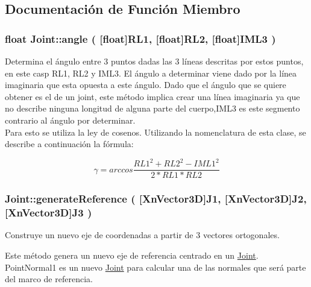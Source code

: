 \subsection{\-Documentación de \-Función \-Miembro}
\hypertarget{class_joint_ab4a853045a69e77e8b67d195be145eed}{
\subsubsection[{angle}]{\setlength{\rightskip}{0pt plus 5cm}float {\bf \-Joint\-::angle} (
[{float}]{\-R\-L1, }
[{float}]{\-R\-L2, }
[{float}]{\-I\-M\-L3}
)}}\label{class_joint_ab4a853045a69e77e8b67d195be145eed}
\-Determina el ángulo entre 3 puntos dadas las 3 líneas descritas por estos puntos, en este casp RL1, RL2 y IML3. \-El ángulo a determinar viene dado por la línea imaginaria que esta opuesta a este ángulo. Dado que el ángulo que se quiere obtener es el de un joint, este método implica crear una línea imaginaria ya que no describe ninguna longitud de alguna parte del cuerpo,\-I\-M\-L3 es este segmento contrario al ángulo por determinar.\\

Para esto se utiliza la ley de cosenos. Utilizando la nomenclatura de esta clase, se describe a continuación la fórmula:

\begin{equation}
\gamma= arccos\frac{RL1^{2}+RL2^{2}-IML1^{2}}{2*RL1*RL2} 
\end{equation}

 \hypertarget{class_joint_a603eab4701f005bc6a39911897eb6c7d}{
\subsubsection[{generate\-Reference}]{ {\bf \-Joint\-::generate\-Reference} (
[{\-Xn\-Vector3\-D}]{\-J1, }
[{\-Xn\-Vector3\-D}]{\-J2, }
[{\-Xn\-Vector3\-D}]{\-J3}
)}}\label{class_joint_a603eab4701f005bc6a39911897eb6c7d}


\-Construye un nuevo eje de coordenadas a partir de 3 vectores ortogonales. 

\-Este método genera un nuevo eje de referencia centrado en un \hyperlink{class_joint}{\-Joint}. \-Point\-Normal1 es un nuevo \hyperlink{class_joint}{\-Joint} para calcular una de las normales que será parte del marco de referencia.

